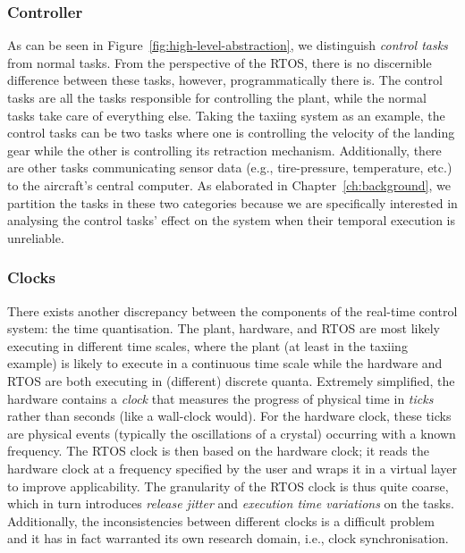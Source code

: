 \subsubsection{Controller}%
%
As can be seen in Figure~\ref{fig:high-level-abstraction}, we distinguish \emph{control tasks} from normal tasks.
From the perspective of the RTOS, there is no discernible difference between these tasks, however, programmatically there is. 
The control tasks are all the tasks responsible for controlling the plant, while the normal tasks take care of everything else.
Taking the taxiing system as an example, the control tasks can be two tasks where one is controlling the velocity of the landing gear while the other is controlling its retraction mechanism.
Additionally, there are other tasks communicating sensor data (e.g., tire-pressure, temperature, etc.) to the aircraft's central computer.
As elaborated in Chapter~\ref{ch:background}, we partition the tasks in these two categories because we are specifically interested in analysing the control tasks' effect on the system when their temporal execution is unreliable. 

\subsubsection{Clocks}%
%
There exists another discrepancy between the components of the real-time control system: the time quantisation.
The plant, hardware, and RTOS are most likely executing in different time scales, where the plant (at least in the taxiing example) is likely to execute in a continuous time scale while the hardware and RTOS are both executing in (different) discrete quanta.
Extremely simplified, the hardware contains a \emph{clock} that measures the progress of physical time in \emph{ticks} rather than seconds (like a wall-clock would).
For the hardware clock, these ticks are physical events (typically the oscillations of a crystal) occurring with a known frequency.
The RTOS clock is then based on the hardware clock; it reads the hardware clock at a frequency specified by the user and wraps it in a virtual layer to improve applicability. 
The granularity of the RTOS clock is thus quite coarse, which in turn introduces \emph{release jitter} and \emph{execution time variations} on the tasks.
Additionally, the inconsistencies between different clocks is a difficult problem and it has in fact warranted its own research domain, i.e., clock synchronisation.

